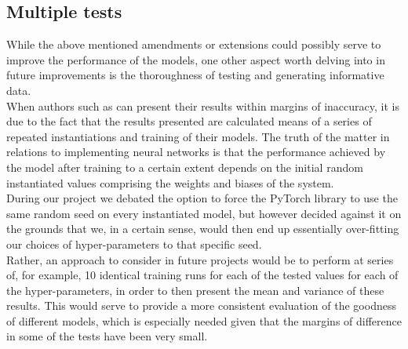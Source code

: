 \subsection{Multiple tests}
While the above mentioned amendments or extensions could possibly serve to improve the performance of the models, one other aspect worth delving into in future improvements is the thoroughness of testing and generating informative data.\\
When authors such as \citeauthor{wang-et-al-2016} can present their results within margins of inaccuracy, it is due to the fact that the results presented are calculated means of a series of repeated instantiations and training of their models. The truth of the matter in relations to implementing neural networks is that the performance achieved by the model after training to a certain extent depends on the initial random instantiated values comprising the weights and biases of the system.\\
During our project we debated the option to force the PyTorch library to use the same random seed on every instantiated model, but however decided against it on the grounds that we, in a certain sense, would then end up essentially over-fitting our choices of hyper-parameters to that specific seed. \\
Rather, an approach to consider in future projects would be to perform at series of, for example, 10 identical training runs for each of the tested values for each of the hyper-parameters, in order to then present the mean and variance of these results. This would serve to provide a more consistent evaluation of the goodness of different models, which is especially needed given that the margins of difference in some of the tests have been very small.

